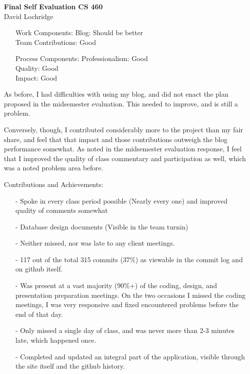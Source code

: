 \documentclass[11pt]{report}
\begin{document}
\begin{center}
	\Large\textbf{Final Self Evaluation CS 460}\\
	\Large{David Lochridge}
\end{center}

\begin{itemize}
\item[Work Components:]
	Blog: Should be better\\
	Team Contributions: Good


\item[Process Components:]
	Professionalism:	Good\\
	Quality:	Good\\
	Impact:	Good
\end{itemize}


As before, I had difficulties with using my blog, and did not enact the plan proposed in the midsemester evaluation. This needed to improve, and is still a problem.

Conversely, though, I contributed considerably more to the project than my fair share, and feel that that impact and those contributions outweigh the blog performance somewhat. As noted in the midsemester evaluation response, I feel that I improved the quality of class commentary and participation as well, which was a noted problem area before.

Contributions and Achievements:
\begin{itemize}
\item[-] Spoke in every class period possible (Nearly every one) and improved quality of comments somewhat
\item[-] Database design documents (Visible in the team turnin)
\item[-] Neither missed, nor was late to any client meetings.
\item[-] 117 out of the total 315 commits (37\%) as viewable in the commit log and on github itself.
\item[-] Was present at a vast majority (90\%+) of the coding, design, and presentation preparation meetings. On the two occasions I missed the coding meetings, I was very responsive and fixed encountered problems before the end of that day.
\item[-] Only missed a single day of class, and was never more than 2-3 minutes late, which happened once.
\item[-] Completed and updated an integral part of the application, visible through the site itself and the github history.
\end{itemize}
\end{document}
